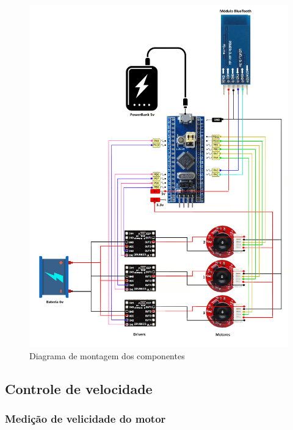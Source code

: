 \begin{figure}[htb]
	\centering
	\includegraphics[width=1.0\textwidth]{figures/diagrama_montagem}
	\caption{Diagrama de montagem dos componentes}
	\label{fig:diagrama_montagem}
\end{figure}


\subsection{Controle de velocidade}

\subsubsection{Medição de velicidade do motor}

